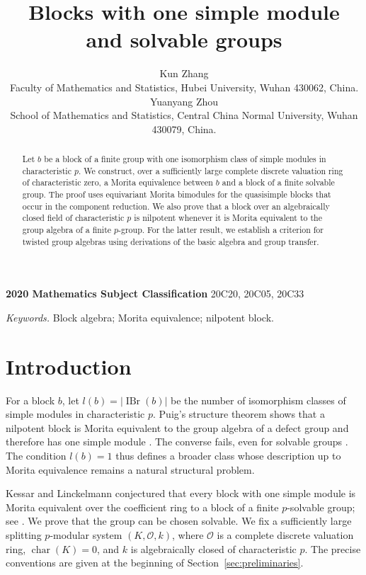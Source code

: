 \documentclass[11pt,a4paper]{article}
\title{Blocks with one simple module\\and solvable groups}
\author{%
	Kun Zhang\\
	{\footnotesize Faculty of Mathematics and Statistics, Hubei University, Wuhan 430062, China.}\\[0.55em]
	Yuanyang Zhou\\
	{\footnotesize School of Mathematics and Statistics, Central China Normal University, Wuhan 430079, China.}%
}
\date{}
\theoremstyle{definition}
\theoremstyle{remark}
\numberwithin{equation}{section}
\newcommand{\cO}{\mathcal{O}}
\DeclareMathOperator{\IBr}{IBr}
\begin{document}
	\maketitle
	\vspace{-2em}
	\begin{abstract}
		Let $b$ be a block of a finite group with one isomorphism class of simple modules in characteristic $p$.
		We construct, over a sufficiently large complete discrete valuation ring of characteristic zero, a Morita equivalence between $b$ and a block of a finite solvable group.
		The proof uses equivariant Morita bimodules for the quasisimple blocks that occur in the component reduction.
		We also prove that a block over an algebraically closed field of characteristic $p$ is nilpotent whenever it is Morita equivalent to the group algebra of a finite $p$-group.
		For the latter result, we establish a criterion for twisted group algebras using derivations of the basic algebra and group transfer.
	\end{abstract}
	\medskip
	\noindent\textbf{2020 Mathematics Subject Classification} 20C20, 20C05, 20C33
	\par\smallskip
	\noindent\textit{Keywords.} Block algebra; Morita equivalence; nilpotent block.
	
	
	\section{Introduction}\label{sec:introduction}
	
	For a block $b$, let $l(b)=|\IBr(b)|$ be the number of isomorphism classes of simple modules in characteristic $p$.
	Puig's structure theorem shows that a nilpotent block is Morita equivalent to the group algebra of a defect group and therefore has one simple module \cite[Theorem~1.6]{Puig1988}.
	The converse fails, even for solvable groups \cite[Theorem~3]{Sambale2024}.
	The condition $l(b)=1$ thus defines a broader class whose description up to Morita equivalence remains a natural structural problem.
	
	Kessar and Linckelmann conjectured that every block with one simple module is Morita equivalent over the coefficient ring to a block of a finite $p$-solvable group; see \cite[Introduction]{MalleNavarroSpath2018}.
	We prove that the group can be chosen solvable.
	We fix a sufficiently large splitting $p$-modular system $(K,\cO,k)$, where $\cO$ is a complete discrete valuation ring, $\operatorname{char}(K)=0$, and $k$ is algebraically closed of characteristic $p$.
	The precise conventions are given at the beginning of Section~\ref{sec:preliminaries}.
	
\end{document}
